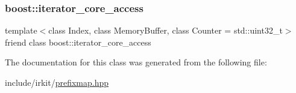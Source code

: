 \subsubsection{\texorpdfstring{boost\+::iterator\+\_\+core\+\_\+access}{boost::iterator\_core\_access}}
{\footnotesize\ttfamily template$<$class Index, class Memory\+Buffer, class Counter = std\+::uint32\+\_\+t$>$ \\
friend class boost\+::iterator\+\_\+core\+\_\+access\hspace{0.3cm}{\ttfamily [friend]}}



The documentation for this class was generated from the following file\+:\begin{DoxyCompactItemize}
\item 
include/irkit/\mbox{\hyperlink{prefixmap_8hpp}{prefixmap.\+hpp}}\end{DoxyCompactItemize}

